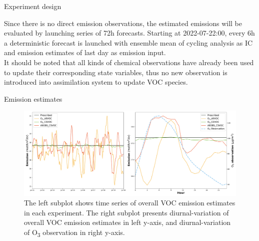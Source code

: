 \documentclass[final]{beamer}
\newlength{\colwidth}
\newlength{\sepparagraph}
\newcommand{\sepnewparagraph}{\vspace{\sepparagraph}}
\begin{document}
\begin{frame}[t]
\begin{columns}[t]
\begin{column}{\colwidth}
\begin{block}{Experiment design}
\begin{table}[t]
\begin{center}
                    \end{center}
                    \caption{Description of VOC selections for each experiment. The VOC species and corresponding scaling factors in the 3rd column will be updated by observations in the 2nd column.}\label{tab_voc}
                    
                \end{table}
                
               Since there is no direct emission observations, the estimated emissions will be evaluated by launching series of 72h forecasts. Starting at 2022-07-22:00, every 6h a deterministic forecast is launched with ensemble mean of cycling analysis as IC and emission estimates of last day as emission input. \\
               \sepnewparagraph
               It should be noted that all kinds of chemical observations have already been used to update their corresponding state variables, thus no new observation is introduced into assimilation system to update VOC species.

			\end{block}

			\begin{alertblock}{Emission estimates}
                \begin{figure}
                \begin{minipage}[c]{0.8\textwidth}
                    \includegraphics[width=\textwidth]{figure/emiss_ts_diurnal_witho3.pdf}
                \end{minipage}
                \hfill
                 \begin{minipage}[c]{0.18\textwidth}
                    \RaggedRight
                    \caption{The left subplot shows time series of overall VOC emission estimates in each experiment. The right subplot presents diurnal-variation of overall VOC emission estimates in left y-axis, and diurnal-variation of O\textsubscript{3} observation  in right y-axis.}\label{fig_emiss_ts}                     
                 \end{minipage}   


\end{figure}
\end{alertblock}
\end{column}
\end{columns}
\end{frame}
\end{document}
